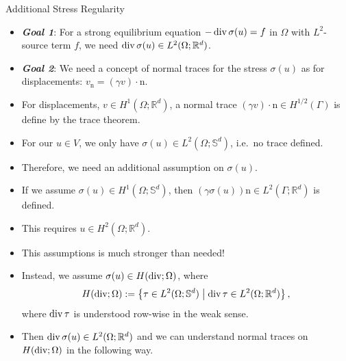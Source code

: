 \documentclass[10pt,aspectratio=169]{beamer}
\def\R{{\mathbb R}}
\def\S{{\mathbb S}}
\newcommand{\diver}{\operatornamewithlimits{div}}
\begin{document}
\begin{frame}{Additional Stress Regularity}
	\begin{itemize}
		\item \textbf{\em Goal 1}: For a strong equilibrium equation $-\diver\sigma(u) = f$ in $\Omega$ with $L^2$-source term $f$, we need $\diver\sigma(u)\in L^2(\Omega;\R^d)$.
		\item \textbf{\em Goal 2}: We need a concept of normal traces for the stress $\sigma(u)$ as for displacements: $v_\mathrm{n} = (\gamma v)\cdot\mathrm{n}$.
		\item For displacements, $v\in H^1(\Omega;\R^d)$, a normal trace $(\gamma v)\cdot\mathrm{n}\in H^{1/2}(\Gamma)$ is define by the trace theorem.
		\item For our $u\in V$, we only have $\sigma(u)\in L^2(\Omega;\S^d)$, i.e.\ no trace defined.
		\item Therefore, we need an additional assumption on $\sigma(u)$.
		\item If we assume $\sigma(u)\in H^1(\Omega;\S^d)$, then $(\gamma\sigma(u))\mathrm{n}\in L^2(\Gamma;\R^d)$ is defined.
		\item This requires $u\in H^2(\Omega;\R^d)$.
		\item This assumptions is much stronger than needed!
		\item Instead, we assume $\sigma(u)\in H(\diver;\Omega)$, where
		      \begin{equation*}
			      H(\diver;\Omega):= \left\{\tau\in L^2(\Omega;\S^d)\;\middle|\;\diver\tau\in L^2(\Omega;\R^d)\right\},
		      \end{equation*}
		      where $\diver \tau$ is understood row-wise in the weak sense.
		\item Then $\diver\sigma(u)\in L^2(\Omega;\R^d)$ and we can understand normal traces on $H(\diver;\Omega)$ in the following way.
	\end{itemize}
\end{frame}
\end{document}
